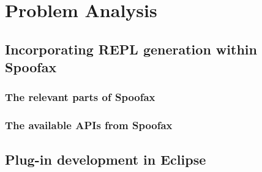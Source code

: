 \section{Problem Analysis}
\label{sec:problem-analysis}


\subsection{Incorporating REPL generation within Spoofax}
\label{ssec:architecture}

\subsubsection{The relevant parts of Spoofax}
\label{sec:which-parts-spoofax}

\subsubsection{The available APIs from Spoofax}
\label{sec:what-are-available}

\subsection{Plug-in development in Eclipse}
\label{ssec:eclipse-plugins}

